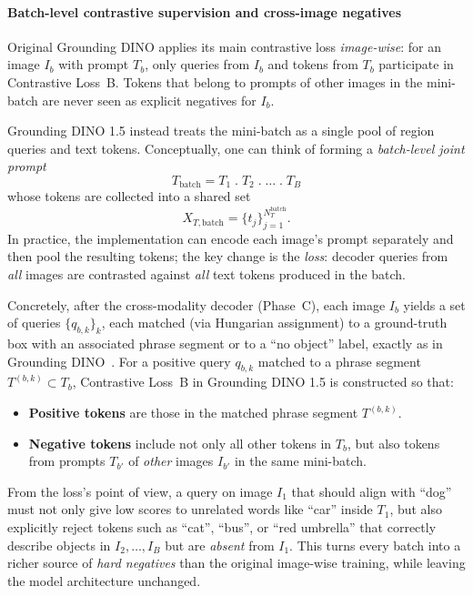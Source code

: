\begin{enrichment}
\begin{enrichment}
		\paragraph{Batch-level contrastive supervision and cross-image negatives}
		
		Original Grounding DINO applies its main contrastive loss \emph{image-wise}: for an image \(I_b\) with prompt \(T_b\), only queries from \(I_b\) and tokens from \(T_b\) participate in Contrastive Loss~B. Tokens that belong to prompts of other images in the mini-batch are never seen as explicit negatives for \(I_b\).
		
		Grounding DINO 1.5 instead treats the mini-batch as a single pool of region queries and text tokens. Conceptually, one can think of forming a \emph{batch-level joint prompt}
		\[
		T_{\text{batch}} = T_1 \;.\; T_2 \;.\; \dots \;.\; T_B
		\]
		whose tokens are collected into a shared set
		\[
		X_{T,\text{batch}} = \bigl\{ t_j \bigr\}_{j=1}^{N_T^{\text{batch}}}.
		\]
		In practice, the implementation can encode each image’s prompt separately and then pool the resulting tokens; the key change is the \emph{loss}: decoder queries from \emph{all} images are contrasted against \emph{all} text tokens produced in the batch.
		
		Concretely, after the cross-modality decoder (Phase~C), each image \(I_b\) yields a set of queries \(\{q_{b,k}\}_k\), each matched (via Hungarian assignment) to a ground-truth box with an associated phrase segment or to a ``no object'' label, exactly as in Grounding DINO~\cite{liu2023_groundingdino}. For a positive query \(q_{b,k}\) matched to a phrase segment \(T^{(b,k)} \subset T_b\), Contrastive Loss~B in Grounding DINO 1.5 is constructed so that:
		\begin{itemize}
			\item \textbf{Positive tokens} are those in the matched phrase segment \(T^{(b,k)}\).
			\item \textbf{Negative tokens} include not only all other tokens in \(T_b\), but also tokens from prompts \(T_{b'}\) of \emph{other} images \(I_{b'}\) in the same mini-batch.
		\end{itemize}
		From the loss’s point of view, a query on image \(I_1\) that should align with ``dog'' must not only give low scores to unrelated words like ``car'' inside \(T_1\), but also explicitly reject tokens such as ``cat'', ``bus'', or ``red umbrella'' that correctly describe objects in \(I_2,\dots,I_B\) but are \emph{absent} from \(I_1\). This turns every batch into a richer source of \emph{hard negatives} than the original image-wise training, while leaving the model architecture unchanged.
		

\end{enrichment}
\end{enrichment}
